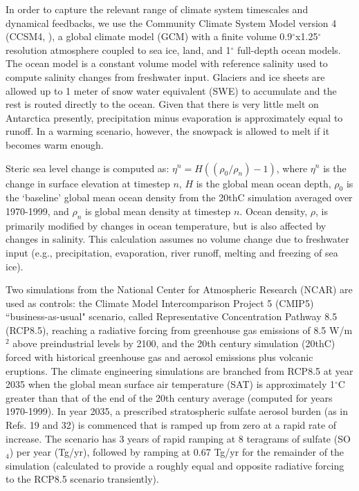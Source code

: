 \documentclass{nature}
\begin{document}
\begin{methods}

In order to capture the relevant range of climate system timescales and dynamical feedbacks, we use the Community Climate System Model version 4 (CCSM4, \cite{gent11}), a global climate model (GCM) with a finite volume 0.9$^\circ$x1.25$^\circ$ resolution atmosphere coupled to sea ice, land, and 1$^\circ$ full-depth ocean models. The ocean model is a constant volume model with reference salinity used to compute salinity changes from freshwater input. Glaciers and ice sheets are allowed up to 1 meter of snow water equivalent (SWE) to accumulate and the rest is routed directly to the ocean. Given that there is very little melt on Antarctica presently, precipitation minus evaporation is approximately equal to runoff. In a warming scenario, however, the snowpack is allowed to melt if it becomes warm enough.  

Steric sea level change is computed as: $\eta^n = H((\rho_0 / \rho_n) -1)$, where $\eta^n$ is the change in surface elevation at timestep $n$, $H$ is the global mean ocean depth, $\rho_0$ is the `baseline' global mean ocean density from the 20thC simulation averaged over 1970-1999, and $\rho_n$ is global mean density at timestep $n$. Ocean density, $\rho$, is primarily modified by changes in ocean temperature, but is also affected by changes in salinity. This calculation assumes no volume change due to freshwater input (e.g., precipitation, evaporation, river runoff, melting and freezing of sea ice).

Two simulations from the National Center for Atmospheric Research (NCAR) are used as controls: the Climate Model Intercomparison Project 5 (CMIP5) ``business-as-usual" scenario, called Representative Concentration Pathway 8.5 (RCP8.5), reaching a radiative forcing from greenhouse gas emissions of 8.5 W/m$^{2}$ above preindustrial levels by 2100, and the 20th century simulation (20thC) forced with historical greenhouse gas and aerosol emissions plus volcanic eruptions. The climate engineering simulations are branched from RCP8.5 at year 2035 when the global mean surface air temperature (SAT) is approximately 1$^\circ$C greater than that of the end of the 20th century average (computed for years 1970-1999). In year 2035, a prescribed stratospheric sulfate aerosol burden (as in Refs. 19 and 32) is commenced that is ramped up from zero at a rapid rate of increase. The scenario has 3 years of rapid ramping at 8 teragrams of sulfate (SO$_4$) per year (Tg/yr), followed by ramping at 0.67 Tg/yr for the remainder of the simulation (calculated to provide a roughly equal and opposite radiative forcing to the RCP8.5 scenario transiently). 


\end{methods}
\end{document}
